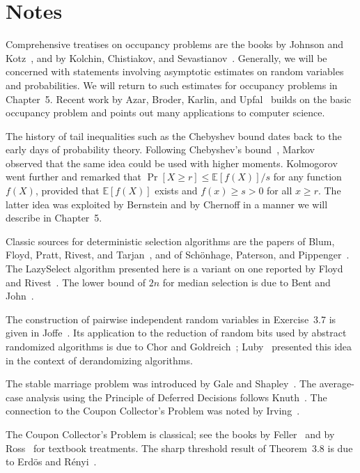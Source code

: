 \documentclass[twoside,12pt]{book}
\theoremstyle{plain}
\theoremstyle{definition}
\theoremstyle{remark}
\begin{document}
\section*{Notes}

Comprehensive treatises on occupancy problems are the books by Johnson and Kotz~\cite{JohnsonKotz1977}, and by Kolchin, Chistiakov, and Sevastianov~\cite{Kolchin1978}. Generally, we will be concerned with statements involving asymptotic estimates on random variables and probabilities. We will return to such estimates for occupancy problems in Chapter~5. Recent work by Azar, Broder, Karlin, and Upfal~\cite{Azar1999} builds on the basic occupancy problem and points out many applications to computer science.

The history of tail inequalities such as the Chebyshev bound dates back to the early days of probability theory. Following Chebyshev's bound~\cite{Chebyshev1867}, Markov~\cite{Markov1912} observed that the same idea could be used with higher moments. Kolmogorov~\cite{Kolmogorov1929} went further and remarked that $\Pr[X \geq r] \leq \mathbb{E}[f(X)]/s$ for any function $f(X)$, provided that $\mathbb{E}[f(X)]$ exists and $f(x) \geq s > 0$ for all $x \geq r$. The latter idea was exploited by Bernstein and by Chernoff in a manner we will describe in Chapter~5.

Classic sources for deterministic selection algorithms are the papers of Blum, Floyd, Pratt, Rivest, and Tarjan~\cite{Blum1973}, and of Sch\"{o}nhage, Paterson, and Pippenger~\cite{Schonhage1976}. The LazySelect algorithm presented here is a variant on one reported by Floyd and Rivest~\cite{Floyd1975}. The lower bound of $2n$ for median selection is due to Bent and John~\cite{Bent1985}.

The construction of pairwise independent random variables in Exercise~3.7 is given in Joffe~\cite{Joffe1946}. Its application to the reduction of random bits used by abstract randomized algorithms is due to Chor and Goldreich~\cite{ChorGoldreich1989}; Luby~\cite{Luby1988} presented this idea in the context of derandomizing algorithms.

The stable marriage problem was introduced by Gale and Shapley~\cite{GaleShapley1962}. The average-case analysis using the Principle of Deferred Decisions follows Knuth~\cite{Knuth1976}. The connection to the Coupon Collector's Problem was noted by Irving~\cite{Irving1985}.

The Coupon Collector's Problem is classical; see the books by Feller~\cite{Feller1968} and by Ross~\cite{Ross1996} for textbook treatments. The sharp threshold result of Theorem~3.8 is due to Erd\"{o}s and R\'{e}nyi~\cite{ErdosRenyi1961}.
\end{document}
